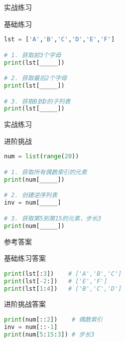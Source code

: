 \documentclass{beamer}
\begin{document}
\begin{frame}[fragile]{实战练习}
\begin{block}{基础练习}
\begin{lstlisting}[language=Python]
lst = ['A','B','C','D','E','F']

# 1. 获取前3个字母
print(lst[_____])

# 2. 获取最后2个字母
print(lst[_____])

# 3. 获取B到D的子列表
print(lst[_____])
\end{lstlisting}
\end{block}
\end{frame}

\begin{frame}[fragile]{实战练习}
\begin{block}{进阶挑战}
\begin{lstlisting}[language=Python]
num = list(range(20))

# 1. 获取所有偶数索引的元素
print(num[_____])

# 2. 创建逆序列表
inv = num[_____]

# 3. 获取第5到第15的元素，步长3
print(num[_____])
\end{lstlisting}
\end{block}
\end{frame}

\begin{frame}[fragile]{参考答案}
\begin{block}{基础练习答案}
\begin{lstlisting}[language=Python]
print(lst[:3])    # ['A','B','C']
print(lst[-2:])   # ['E','F'] 
print(lst[1:4])   # ['B','C','D']
\end{lstlisting}
\end{block}

\begin{block}{进阶挑战答案}
\begin{lstlisting}[language=Python]
print(num[::2])    # 偶数索引
inv = num[::-1]
print(num[5:15:3]) # 步长3
\end{lstlisting}
\end{block}
\end{frame}
\end{document}
